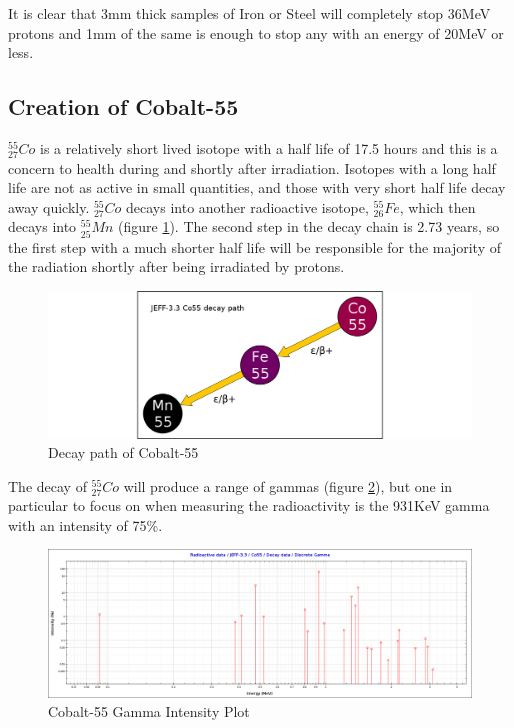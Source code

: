 It is clear that 3mm thick samples of Iron or Steel will completely stop 36MeV protons and 1mm of the same is enough to stop any with an energy of 20MeV or less.


\subsection{Creation of Cobalt-55}

${}^{55}_{27} Co$ is a relatively short lived isotope with a half life of 17.5 hours and this is a concern to health during and shortly after irradiation.  Isotopes with a long half life are not as active in small quantities, and those with very short half life decay away quickly.  ${}^{55}_{27} Co$ decays into another radioactive isotope, ${}^{55}_{26} Fe$, which then decays into ${}^{55}_{25} Mn$ (figure \ref{fig:DecayPathCo55}).  The second step in the decay chain is 2.73 years, so the first step with a much shorter half life will be responsible for the majority of the radiation shortly after being irradiated by protons.

\FloatBarrier
\begin{figure}[h]
  \begin{center}
    \includegraphics[width=0.5\linewidth]{chapters/activity_code/fe-co55/Co55_decay_path.png}
    \caption{Decay path of Cobalt-55}
    \label{fig:DecayPathCo55}
  \end{center}
\end{figure}

\FloatBarrier
The decay of ${}^{55}_{27} Co$ will produce a range of gammas (figure \ref{fig:Co55GammaIntensity}), but one in particular to focus on when measuring the radioactivity is the 931KeV gamma with an intensity of 75\%.

\FloatBarrier
\begin{figure}[h]
  \begin{center}
    \includegraphics[width=0.9\linewidth]{chapters/activity_code/fe-co55/Co55_discrete_gamma.png}
    \caption{Cobalt-55 Gamma Intensity Plot}
    \label{fig:Co55GammaIntensity}
  \end{center}
\end{figure}

